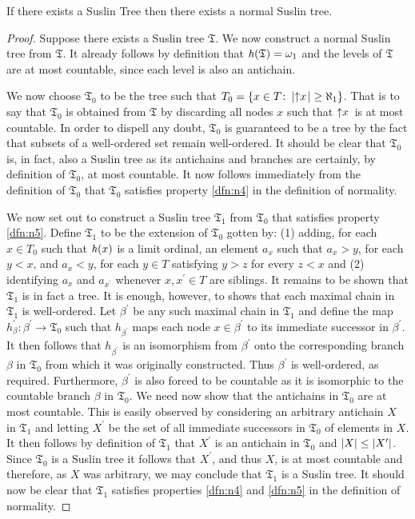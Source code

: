 \begin{lem}\label{lem:norm}
	If there exists a Suslin Tree then there exists a normal Suslin tree.
\end{lem}
\begin{proof}
	Suppose there exists a Suslin tree $\mathfrak{T}$.  We now construct a normal Suslin tree from $\mathfrak{T}$.  It already follows by definition that $\mathit{h}(\mathfrak{T})=\omega_1$ and the levels of $\mathfrak{T}$ are at most countable, since each level is also an antichain.

	We now choose $\mathfrak{T}_0$ to be the tree such that $T_0=\lbrace x\in T\colon \left\lvert\left\uparrow x\right.\right\rvert\geq\aleph_1 \rbrace$.  That is to say that $\mathfrak{T}_0$ is obtained from $\mathfrak{T}$ by discarding all nodes $x$ such that $\left\uparrow x\right.$ is at most countable.  In order to dispell any doubt, $\mathfrak{T}_0$ is guaranteed to be a tree by the fact that subsets of a well-ordered set remain well-ordered.  It should be clear that $\mathfrak{T}_0$ is, in fact, also a Suslin tree as its antichains and branches are certainly, by definition of $\mathfrak{T}_0$, at most countable.  It now follows immediately from the definition of $\mathfrak{T}_0$ that $\mathfrak{T}_0$ satisfies property \ref{dfn:n4} in the definition of normality.

	We now set out to construct a Suslin tree $\mathfrak{T}_1$ from $\mathfrak{T}_0$ that satisfies property \ref{dfn:n5}.  Define $\mathfrak{T}_1$ to be the extension of $\mathfrak{T}_0$ gotten by: (1) adding, for each $x\in T_0$ such that $\mathit{h}(x)$ is a limit ordinal, an element $a_x$ such that $a_x>y$, for  each $y<x$, and $a_x<y$, for each $y\in T$ satisfying $y>z$ for every $z<x$ and (2) identifying $a_x$ and $a_{x^\prime}$ whenever $x,x^\prime\in T$ are siblings.  It remains to be shown that $\mathfrak{T}_1$ is in fact a tree.  It is enough, however, to shows that each maximal chain in $\mathfrak{T}_1$ is well-ordered.  Let $\beta^\prime$ be any such maximal chain in $\mathfrak{T}_1$ and define the map $h_\beta^\prime\colon\beta^\prime\to\mathfrak{T}_0$ such that $h_{\beta^\prime}$ maps each node $x\in\beta^\prime$ to its immediate successor in $\beta^\prime$.  It then follows that $h_{\beta^\prime}$ is an isomorphism from $\beta^\prime$ onto the corresponding branch $\beta$ in $\mathfrak{T}_0$ from which it was originally constructed.  Thus $\beta^\prime$ is well-ordered, as required.  Furthermore, $\beta^\prime$ is also forced to be countable as it is isomorphic to the countable branch $\beta$ in $\mathfrak{T}_0$.  We need now show that the antichains in $\mathfrak{T}_0$ are at most countable.  This is easily observed by considering an arbitrary antichain $X$ in $\mathfrak{T}_1$ and letting $X^\prime$ be the set of all immediate successors in $\mathfrak{T}_0$ of elements in $X$.  It then follows by definition of $\mathfrak{T}_1$ that $X^\prime$ is an antichain in $\mathfrak{T}_0$ and $\left\lvert X\right\rvert\leq\left\lvert X^\prime\right\rvert$.  Since $\mathfrak{T}_0$ is a Suslin tree it follows that $X^\prime$, and thus $X$, is at most countable and therefore, as $X$ was arbitrary, we may conclude that $\mathfrak{T}_1$ is a Suslin tree.  It should now be clear that $\mathfrak{T}_1$ satisfies properties \ref{dfn:n4} and \ref{dfn:n5} in the definition of normality.


\end{proof}
